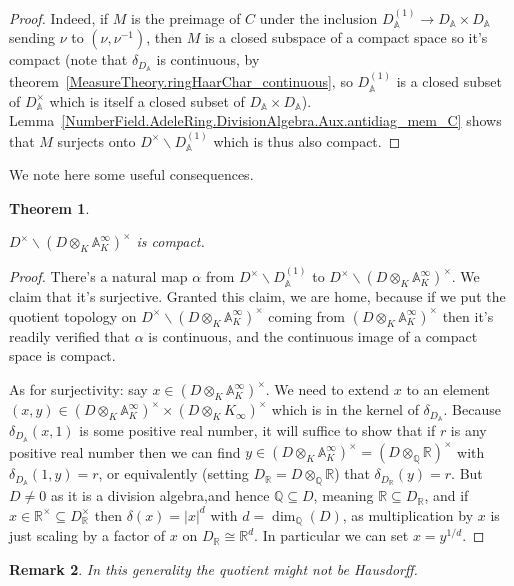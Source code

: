 \documentclass[10pt,a4paper]{article}
\newcommand{\A}{\mathbb{A}}
\newcommand{\Q}{\mathbb{Q}}
\newcommand{\R}{\mathbb{R}}
\newcounter{chapter}
\newtheorem{theorem}{Theorem}[chapter]
\newtheorem{remark}[theorem]{Remark}
\newcommand{\uses}[1]{}
\newcommand{\proves}[1]{}
\newcommand{\lean}[1]{}
\newcommand{\leanok}{}
\begin{document}
\begin{proof}
  \proves{NumberField.AdeleRing.DivisionAlgebra.compact_quotient}
  \leanok
  \uses{MeasureTheory.ringHaarChar_continuous,
    NumberField.AdeleRing.DivisionAlgebra.Aux.antidiag_mem_C,
    NumberField.AdeleRing.DivisionAlgebra.Aux.C_compact}
  Indeed, if $M$ is the preimage of $C$ under the inclusion $D_{\A}^{(1)} \to D_{\A}\times D_{\A}$
  sending $\nu$ to $(\nu,\nu^{-1})$, then $M$ is a closed subspace
    of a compact
  space so it's compact (note that $\delta_{D_{\A}}$ is continuous,
  by theorem~\ref{MeasureTheory.ringHaarChar_continuous}, so $D_{\A}^{(1)}$ is a closed subset of
  $D_{\A}^\times$ which is itself a closed subset of $D_{\A}\times D_{\A}$).
  Lemma~\ref{NumberField.AdeleRing.DivisionAlgebra.Aux.antidiag_mem_C} shows that $M$ surjects onto
  $D^\times\backslash D_{\A}^{(1)}$ which is thus also compact.
\end{proof}


We note here some useful consequences.

\begin{theorem}
  \label{NumberField.FiniteAdeleRing.DivisionAlgebra.units_cocompact}
  \lean{NumberField.FiniteAdeleRing.DivisionAlgebra.units_cocompact}
  \leanok
  $D^\times\backslash(D\otimes_K\A_K^\infty)^\times$ is compact.
\end{theorem}
\begin{proof}
  \uses{NumberField.AdeleRing.DivisionAlgebra.compact_quotient}
  \leanok
There's a natural map $\alpha$ from $D^\times\backslash D_{\A}^{(1)}$ to
  $D^\times\backslash (D\otimes_K \A_K^\infty)^\times$. We claim that it's
  surjective. Granted this claim, we are home, because if we put the quotient
  topology on $D^\times\backslash (D\otimes_K \A_K^\infty)^\times$ coming from
  $(D\otimes_K \A_K^\infty)^\times$ then it's readily verified that $\alpha$
  is continuous, and the continuous image of a compact space is compact.

  As for surjectivity: say $x\in (D\otimes_K \A_K^\infty)^\times$. We need to extend
  $x$ to an element $(x,y)\in (D\otimes_K \A_K^\infty)^\times\times(D\otimes_K K_\infty)^\times$
  which is in the kernel of $\delta_{D_{\A}}$. Because $\delta_{D_{\A}}(x,1)$ is some positive
  real number, it will suffice to show that if $r$ is any positive real number then we can
  find $y\in (D\otimes_K \A_K^\infty)^\times=(D\otimes_{\Q}\R)^\times$ with $\delta_{D_{\A}}(1,y)=r$,
  or equivalently (setting $D_{\R}=D\otimes_{\Q}\R$) that $\delta_{D_{\R}}(y)=r$.
  But $D\not=0$ as it is a division algebra,and hence $\Q\subseteq D$, meaning
  $\R\subseteq D_{\R}$, and if
  $x\in\R^\times\subseteq D_{\R}^\times$ then $\delta(x)=|x|^d$ with $d=\dim_{\Q}(D)$,
  as multiplication by $x$ is just scaling by a factor of $x$ on $D_{\R}\cong\R^d$.
  In particular we can set $x=y^{1/d}$.
\end{proof}
\begin{remark} In this generality the quotient might not be Hausdorff.
\end{remark}
\end{document}
